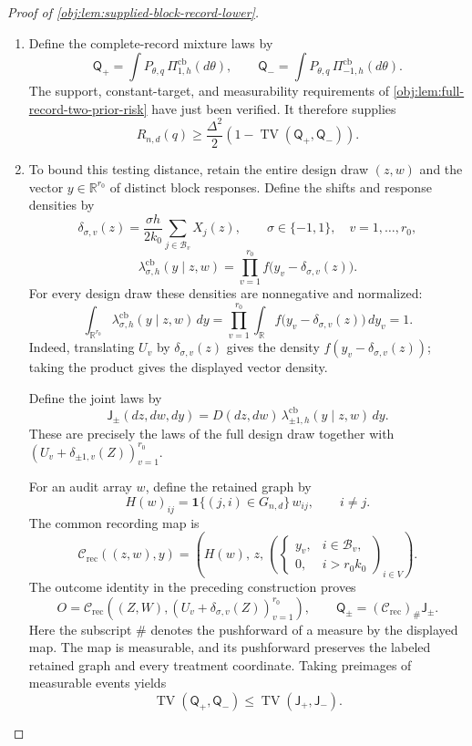 \begin{proof}[Proof of \cref{obj:lem:supplied-block-record-lower}]
\begin{enumerate}
\item Define the complete-record mixture laws by
\[
\mathsf Q_+
=
\int P_{\theta,q}\,\Pi^{\mathrm{cb}}_{1,h}(d\theta),
\qquad
\mathsf Q_-
=
\int P_{\theta,q}\,\Pi^{\mathrm{cb}}_{-1,h}(d\theta).
\]
The support, constant-target, and measurability requirements of
\cref{obj:lem:full-record-two-prior-risk} have just been verified. It therefore supplies
\[
R_{n,d}(q)
\ge
\frac{\Delta^2}{2}
\left(1-\operatorname{TV}(\mathsf Q_+,\mathsf Q_-)\right).
\]

\item To bound this testing distance, retain the entire design draw \((z,w)\) and the vector \(y\in\mathbb R^{r_0}\) of distinct block responses. Define the shifts and response densities by
\[
\delta_{\sigma,v}(z)
=
\frac{\sigma h}{2k_0}
\sum_{j\in\mathcal B_v}X_j(z),
\qquad
\sigma\in\{-1,1\},\quad v=1,\ldots,r_0,
\]
\[
\lambda^{\mathrm{cb}}_{\sigma,h}(y\mid z,w)
=
\prod_{v=1}^{r_0}f\bigl(y_v-\delta_{\sigma,v}(z)\bigr).
\]
For every design draw these densities are nonnegative and normalized:
\[
\int_{\mathbb R^{r_0}}
\lambda^{\mathrm{cb}}_{\sigma,h}(y\mid z,w)\,dy
=
\prod_{v=1}^{r_0}
\int_{\mathbb R}f\bigl(y_v-\delta_{\sigma,v}(z)\bigr)\,dy_v
=1.
\]
Indeed, translating \(U_v\) by \(\delta_{\sigma,v}(z)\) gives the density
\(f(y_v-\delta_{\sigma,v}(z))\); taking the product gives the displayed vector density.

Define the joint laws by
\[
\mathsf J_\pm(dz,dw,dy)
=
D(dz,dw)\,
\lambda^{\mathrm{cb}}_{\pm1,h}(y\mid z,w)\,dy.
\]
These are precisely the laws of the full design draw together with
\((U_v+\delta_{\pm1,v}(Z))_{v=1}^{r_0}\).

For an audit array \(w\), define the retained graph by
\[
H(w)_{ij}
=
\mathbf1\{(j,i)\in G_{n,d}\}\,w_{ij},
\qquad i\ne j.
\]
The common recording map is
\[
\mathcal C_{\mathrm{rec}}((z,w),y)
=
\left(
H(w),\,z,\,
\left(
\begin{cases}
y_v,&i\in\mathcal B_v,\\
0,&i>r_0k_0
\end{cases}
\right)_{i\in V}
\right).
\]
The outcome identity in the preceding construction proves
\[
O
=
\mathcal C_{\mathrm{rec}}
\left((Z,W),(U_v+\delta_{\sigma,v}(Z))_{v=1}^{r_0}\right),
\qquad
\mathsf Q_\pm=(\mathcal C_{\mathrm{rec}})_\#\mathsf J_\pm.
\]
Here the subscript \(\#\) denotes the pushforward of a measure by the displayed map. The map is measurable, and its pushforward preserves the labeled retained graph and every treatment coordinate. Taking preimages of measurable events yields
\[
\operatorname{TV}(\mathsf Q_+,\mathsf Q_-)
\le
\operatorname{TV}(\mathsf J_+,\mathsf J_-).
\]


\end{enumerate}
\end{proof}
